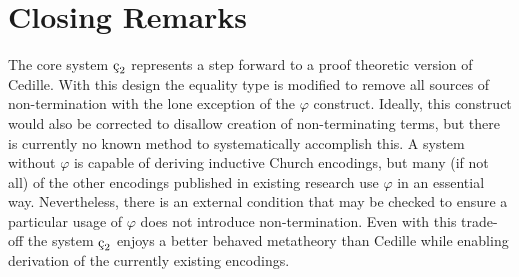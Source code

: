 \section{Closing Remarks}

The core system $\ced$ represents a step forward to a proof theoretic version of Cedille.
With this design the equality type is modified to remove all sources of non-termination with the lone exception of the $\varphi$ construct.
Ideally, this construct would also be corrected to disallow creation of non-terminating terms, but there is currently no known method to systematically accomplish this.
A system without $\varphi$ is capable of deriving inductive Church encodings, but many (if not all) of the other encodings published in existing research use $\varphi$ in an essential way.
Nevertheless, there is an external condition that may be checked to ensure a particular usage of $\varphi$ does not introduce non-termination.
Even with this trade-off the system $\ced$ enjoys a better behaved metatheory than Cedille while enabling derivation of the currently existing encodings.
